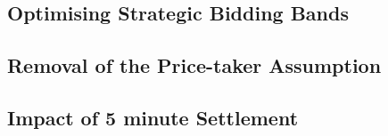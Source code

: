 \subsection{Optimising Strategic Bidding Bands}

\subsection{Removal of the Price-taker Assumption}
\subsection{Impact of 5 minute Settlement}
